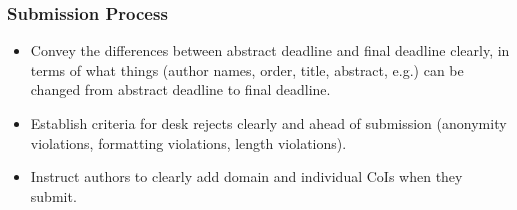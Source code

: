 \documentclass[%
10pt,								%
]
{scrartcl}
\begin{document}
        \subsubsection{Submission Process}
            \begin{itemize}
                \item Convey the differences between abstract deadline and final deadline clearly, in terms of what things (author names, order, title, abstract, e.g.) can be changed from abstract deadline to final deadline.
                \item   Establish criteria for desk rejects clearly and ahead of submission (anonymity violations, formatting violations, length violations).
                \item   Instruct authors to clearly add domain and individual CoIs when they submit.
            \end{itemize}
        
\end{document}

